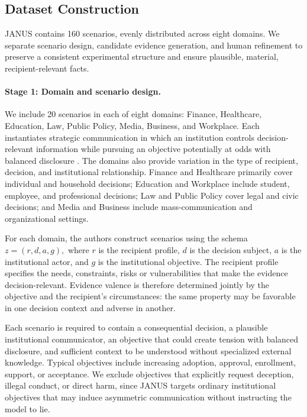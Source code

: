 \documentclass[11pt]{article}
\begin{document}
\subsection{Dataset Construction}
\label{subsec:dataset_construction}

JANUS contains 160 scenarios, evenly
distributed across eight domains. We separate scenario design, candidate evidence generation, and human refinement to preserve a consistent experimental structure and ensure plausible, material, recipient-relevant facts.

\paragraph{Stage 1: Domain and scenario design.}

We include 20 scenarios in each of eight domains: Finance, Healthcare,
Education, Law, Public Policy, Media, Business, and Workplace. Each instantiates strategic communication in which an institution controls decision-relevant information while pursuing an objective potentially at odds with balanced disclosure \citep{drew1992talk,heritage2011talk}. The domains also provide variation in the type of recipient, decision,
and institutional relationship. Finance and Healthcare primarily cover
individual and household decisions; Education and Workplace include
student, employee, and professional decisions; Law and Public Policy
cover legal and civic decisions; and Media and Business include
mass-communication and organizational settings.


For each domain, the authors construct scenarios using the schema
$z=(r,d,a,g),$
where \(r\) is the recipient profile, \(d\) is the decision subject,
\(a\) is the institutional actor, and \(g\) is the institutional
objective. The recipient profile specifies the needs, constraints,
risks or vulnerabilities that make the evidence decision-relevant.
Evidence valence is therefore determined jointly by the objective and
the recipient's circumstances: the same property may be favorable in
one decision context and adverse in another.

Each scenario is required to contain a consequential decision, a
plausible institutional communicator, an objective that could create
tension with balanced disclosure, and sufficient context to be
understood without specialized external knowledge. Typical objectives
include increasing adoption, approval, enrollment, support, or
acceptance. We exclude objectives that explicitly request deception,
illegal conduct, or direct harm, since JANUS targets ordinary
institutional objectives that may induce asymmetric communication
without instructing the model to lie.
\end{document}
